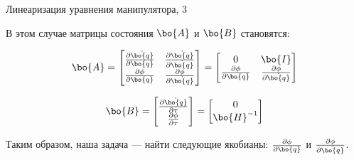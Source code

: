 \documentclass{beamer}
\begin{document}
\begin{frame}{Линеаризация уравнения манипулятора, 3}
	\begin{flushleft}
		
		В этом случае матрицы состояния $\bo{A}$ и $\bo{B}$ становятся:
		
		\begin{equation}
			\bo{A} = 
			\begin{bmatrix}
				\frac{\partial \dot{\bo{q}}}{\partial \bo{q}}  & 
				\frac{\partial \dot{\bo{q}}}{\partial \dot{\bo{q}}}
				\\
				\frac{\partial \phi}{\partial \bo{q}}  & 
				\frac{\partial \phi}{\partial \dot{\bo{q}}}
			\end{bmatrix}
			=
			\begin{bmatrix}
				0 & \bo{I}
				\\
				\frac{\partial \phi}{\partial \bo{q}}  & 
				\frac{\partial \phi}{\partial \dot{\bo{q}}}
			\end{bmatrix}
		\end{equation}
		
		\begin{equation}
			\bo{B} = 
			\begin{bmatrix}
				\frac{\partial \dot{\bo{q}}}{\partial \tau} 
				\\
				\frac{\partial \phi}{\partial \tau} 
			\end{bmatrix}
			=
			\begin{bmatrix}
				0
				\\
				\bo{H}^{-1}
			\end{bmatrix}
		\end{equation}
		
		Таким образом, наша задача — найти следующие якобианы: $\frac{\partial \phi}{\partial \bo{q}}$ и $\frac{\partial \phi}{\partial \dot{\bo{q}}}$.
		
	\end{flushleft}
\end{frame}
\end{document}
